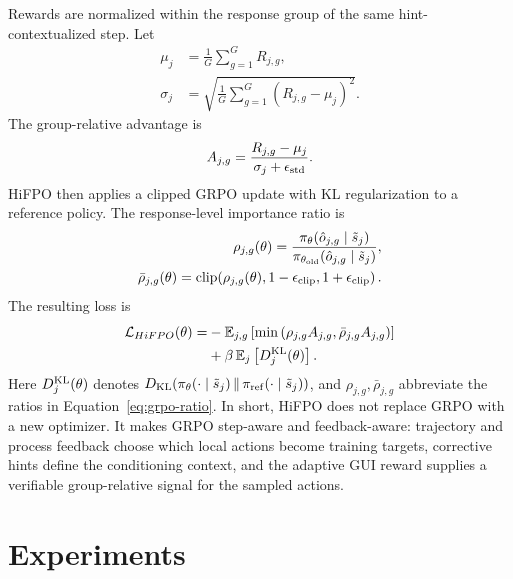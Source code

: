 \documentclass{llmxive}
\providecommand{\hifpo}{HiFPO\xspace}
\begin{document}
Rewards are normalized within the response group of the same hint-contextualized step. Let
\begin{equation}
\label{eq:group-stats}
\begin{aligned}
    \mu_j&=\frac{1}{G}\sum_{g=1}^{G}R_{j,g},\\
    \sigma_j&=\sqrt{\frac{1}{G}\sum_{g=1}^{G}(R_{j,g}-\mu_j)^2}.
\end{aligned}
\end{equation}
The group-relative advantage is
\begin{equation}
\label{eq:grpo-adv}
    A_{j,g}=
    \frac{R_{j,g}-\mu_j}{\sigma_j+\epsilon_{\rm std}}.
\end{equation}
\hifpo then applies a clipped GRPO update with KL regularization to a reference policy. The response-level importance ratio is
\begin{equation}
\label{eq:grpo-ratio}
\begin{aligned}
    \rho_{j,g}(\theta)=
    \frac{\pi_\theta(\hat{o}_{j,g}\mid\tilde{s}_j)}
         {\pi_{\theta_{\rm old}}(\hat{o}_{j,g}\mid\tilde{s}_j)},\\
    \bar{\rho}_{j,g}(\theta)=
    \operatorname{clip}\!\left(
    \rho_{j,g}(\theta),
    1-\epsilon_{\rm clip},
    1+\epsilon_{\rm clip}
    \right).
\end{aligned}
\end{equation}
The resulting loss is
\begin{equation}
\label{eq:hifpo-objective}
\begin{aligned}
\mathcal{L}_{\hifpo}(\theta)
=&-\mathbb{E}_{j,g}
\left[\min\left(\rho_{j,g}A_{j,g},
\bar{\rho}_{j,g}A_{j,g}\right)\right]\\
&+\beta\,\mathbb{E}_{j}\left[D^{\rm KL}_{j}(\theta)\right].
\end{aligned}
\end{equation}
Here $D^{\rm KL}_{j}(\theta)$ denotes
$D_{\rm KL}\!\left(\pi_\theta(\cdot\mid\tilde{s}_j)\,\|\,\pi_{\rm ref}(\cdot\mid\tilde{s}_j)\right)$, and $\rho_{j,g},\bar{\rho}_{j,g}$ abbreviate the ratios in Equation~\ref{eq:grpo-ratio}.
In short, \hifpo does not replace GRPO with a new optimizer. It makes GRPO step-aware and feedback-aware: trajectory and process feedback choose which local actions become training targets, corrective hints define the conditioning context, and the adaptive GUI reward supplies a verifiable group-relative signal for the sampled actions.

\section{Experiments}
\label{sec:experiments}
\end{document}
